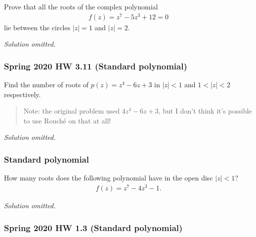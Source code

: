 \begin{problem}[?]

Prove that all the roots of the complex polynomial
\begin{align*}f(z) = z^7 - 5 z^3 +12 =0\end{align*}
lie between the circles \(|z|=1\) and \(|z|=2\).

\end{problem}

\emph{Solution omitted.}

\hypertarget{spring-2020-hw-3.11-standard-polynomial}{%
\subsubsection{Spring 2020 HW 3.11 (Standard
polynomial)}\label{spring-2020-hw-3.11-standard-polynomial}}

\begin{problem}[?]

Find the number of roots of \(p(z) = z^4 - 6z + 3\) in
\({\left\lvert {z} \right\rvert} < 1\) and
\(1 < {\left\lvert {z} \right\rvert} < 2\) respectively.

\begin{quote}
Note: the original problem used \(4z^4-6z+3\), but I don't think it's
possible to use Rouché on that at all!
\end{quote}

\end{problem}

\emph{Solution omitted.}

\hypertarget{standard-polynomial}{%
\subsubsection{Standard polynomial}\label{standard-polynomial}}

\begin{problem}[?]

How many roots does the following polynomial have in the open disc
\({\left\lvert {z} \right\rvert} < 1\)?
\begin{align*}
f(z) = z^7 - 4z^3 - 1
.\end{align*}

\end{problem}

\emph{Solution omitted.}

\hypertarget{spring-2020-hw-1.3-standard-polynomial}{%
\subsubsection{Spring 2020 HW 1.3 (Standard
polynomial)}\label{spring-2020-hw-1.3-standard-polynomial}}

